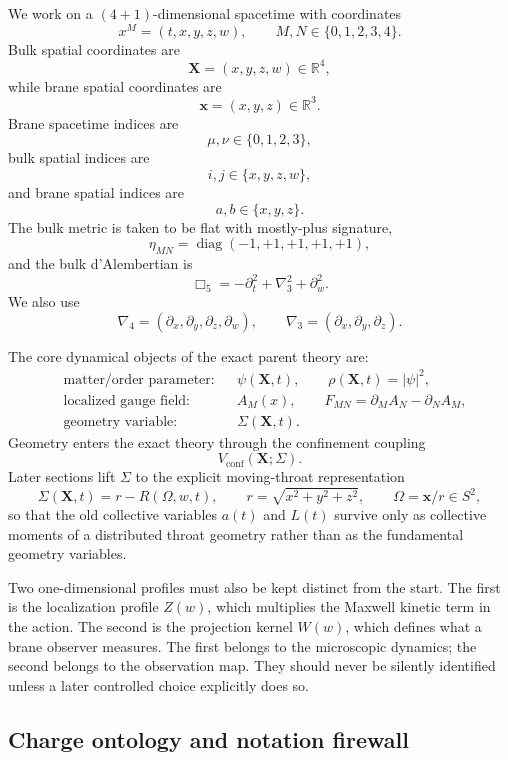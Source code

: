 \documentclass[11pt]{article}
\theoremstyle{definition}
\begin{document}
We work on a $(4+1)$-dimensional spacetime with coordinates
\[
 x^M=(t,x,y,z,w),
 \qquad M,N\in\{0,1,2,3,4\}.
\]
Bulk spatial coordinates are
\[
 \mathbf X=(x,y,z,w)\in\mathbb R^4,
\]
while brane spatial coordinates are
\[
 \mathbf x=(x,y,z)\in\mathbb R^3.
\]
Brane spacetime indices are
\[
 \mu,\nu\in\{0,1,2,3\},
\]
bulk spatial indices are
\[
 i,j\in\{x,y,z,w\},
\]
and brane spatial indices are
\[
 a,b\in\{x,y,z\}.
\]
The bulk metric is taken to be flat with mostly-plus signature,
\[
 \eta_{MN}=\operatorname{diag}(-1,+1,+1,+1,+1),
\]
and the bulk d'Alembertian is
\[
 \Box_5=-\partial_t^2+\nabla_3^2+\partial_w^2.
\]
We also use
\[
 \nabla_4=(\partial_x,\partial_y,\partial_z,\partial_w),
 \qquad
 \nabla_3=(\partial_x,\partial_y,\partial_z).
\]

The core dynamical objects of the exact parent theory are:
\begin{align*}
 &\text{matter/order parameter:} && \psi(\mathbf X,t),\qquad \rho(\mathbf X,t)=|\psi|^2,\\
 &\text{localized gauge field:} && A_M(x),\qquad F_{MN}=\partial_M A_N-\partial_N A_M,\\
 &\text{geometry variable:} && \Sigma(\mathbf X,t).
\end{align*}
Geometry enters the exact theory through the confinement coupling
\[
V_{\mathrm{conf}}(\mathbf X;\Sigma).
\]
Later sections lift \(\Sigma\) to the explicit moving-throat representation
\[
\Sigma(\mathbf X,t)=r-R(\Omega,w,t),
\qquad
r=\sqrt{x^2+y^2+z^2},
\qquad
\Omega=\mathbf x/r\in S^2,
\]
so that the old collective variables \(a(t)\) and \(L(t)\) survive only as collective moments of a distributed throat geometry rather than as the fundamental geometry variables.

Two one-dimensional profiles must also be kept distinct from the start. The first is the localization profile \(Z(w)\), which multiplies the Maxwell kinetic term in the action. The second is the projection kernel \(W(w)\), which defines what a brane observer measures. The first belongs to the microscopic dynamics; the second belongs to the observation map. They should never be silently identified unless a later controlled choice explicitly does so.

\subsection{Charge ontology and notation firewall}
\end{document}
